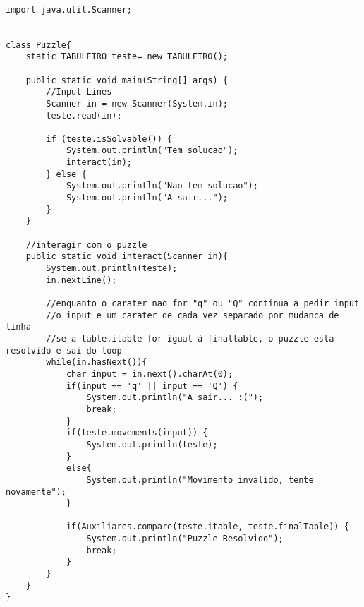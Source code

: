 \documentclass[12pt]{article}
\begin{document}
\paragraph{}
\begin{lstlisting}[frame=single]
import java.util.Scanner;


class Puzzle{
    static TABULEIRO teste= new TABULEIRO();
    
    public static void main(String[] args) {
        //Input Lines
        Scanner in = new Scanner(System.in);
        teste.read(in);

        if (teste.isSolvable()) {
            System.out.println("Tem solucao");
            interact(in);
        } else {
            System.out.println("Nao tem solucao");
            System.out.println("A sair...");
        }
    }

    //interagir com o puzzle
    public static void interact(Scanner in){
        System.out.println(teste);
        in.nextLine();

        //enquanto o carater nao for "q" ou "Q" continua a pedir input
        //o input e um carater de cada vez separado por mudanca de linha
        //se a table.itable for igual á finaltable, o puzzle esta resolvido e sai do loop
        while(in.hasNext()){
            char input = in.next().charAt(0);
            if(input == 'q' || input == 'Q') {
                System.out.println("A sair... :(");
                break;
            }
            if(teste.movements(input)) {
                System.out.println(teste);
            }
            else{
                System.out.println("Movimento invalido, tente novamente");
            }

            if(Auxiliares.compare(teste.itable, teste.finalTable)) {
                System.out.println("Puzzle Resolvido");
                break;
            }
        }
    }
}
\end{lstlisting}
\end{document}
